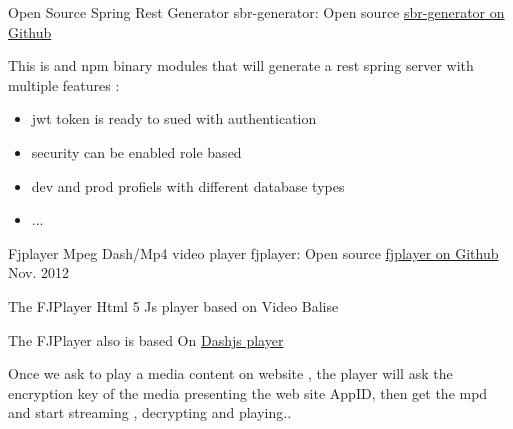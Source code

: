 \documentclass[11pt, a4paper]{awesome-cv} %
\begin{document}
\begin{cventries}

    \cventry
    {Open Source Spring Rest Generator } %
    {sbr-generator: Open source} %
    { \href{https://github.com/medazzo/sbr-generator}{sbr-generator on Github} }%
    {} %
    { %
        \begin{cvitems}
            \item {This is and npm binary modules that will generate a rest spring server with multiple features :}
            \begin{itemize}
                \item {jwt token is ready to sued with authentication}
                \item {security can be enabled  role based }
                \item {dev and prod profiels with different  database types}
                \item {...}
            \end{itemize}
        \end{cvitems}
    }


    \cventry
    {Fjplayer Mpeg Dash/Mp4 video player  } %
    {fjplayer: Open source } %
    { \href{hhttps://github.com/medazzo/fjplayer}{fjplayer on Github} } %
    {Nov. 2012} %
    { %
        \begin{cvitems}
            \item {The FJPlayer Html 5 Js player based on Video Balise }
            \item {The FJPlayer also is based On \href{http://dashif.org/reference/players/javascript/1.4.0/samples/dash-if-reference-player/}{Dashjs player} }
            \item {Once we ask to play a media content on website , the player will ask the encryption key of the media presenting the web site AppID, then get the mpd and start streaming , decrypting  and playing..}
        \end{cvitems}
    }



\end{cventries}
\end{document}

